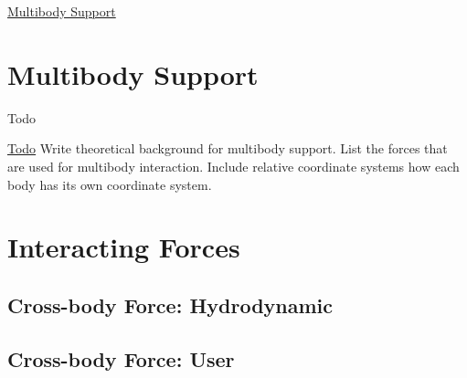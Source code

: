 \hyperlink{multibody_support}{Multibody Support} \hypertarget{multibody_support}{}\section{Multibody Support}\label{multibody_support}
\begin{DoxyRefDesc}{Todo}
\item[\hyperlink{todo__todo000001}{Todo}]Write theoretical background for multibody support. List the forces that are used for multibody interaction. Include relative coordinate systems how each body has its own coordinate system.\end{DoxyRefDesc}


\section*{Interacting Forces}

\subsection*{Cross-\/body Force\-: Hydrodynamic}

\subsection*{Cross-\/body Force\-: User}